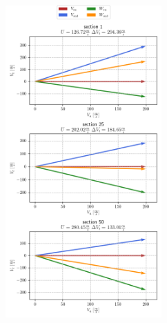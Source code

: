 {\nologo
\begin{frame}
	\begin{columns}
			\begin{figure}
				\centering
				\includegraphics[width=0.7\textwidth]{figures/rotorVelocityTriangle.png}
			\end{figure}
			\begin{figure}
				\centering

\end{figure}
\end{columns}
\end{frame}}

